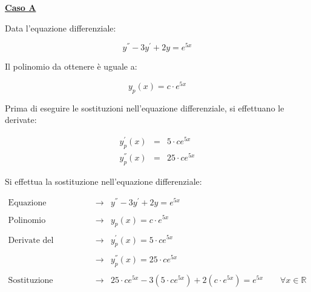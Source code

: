 \documentclass[a4paper]{article}
\begin{document}
	\begin{center}
		\large
		\textcolor{Green4}{\textbf{\underline{Caso A}}}
	\end{center}

	\noindent
	Data l'equazione differenziale:
	
	\begin{equation*}
		y^{''} - 3y^{'} +2y = e^{5x}
	\end{equation*}

	\noindent
	Il polinomio da ottenere è uguale a:
	
	\begin{equation*}
		y_{p}\left(x\right) = c \cdot e^{5x}
	\end{equation*}

	\noindent
	Prima di eseguire le sostituzioni nell'equazione differenziale, si effettuano le derivate:
	
	\begin{equation*}
		\begin{array}{lll}
			y_{p}^{'}\left(x\right)	& = & 5 \cdot c e^{5x} \\
			y_{p}^{''}\left(x\right)& = & 25 \cdot c e^{5x}
		\end{array}
	\end{equation*}

	\noindent
	Si effettua la sostituzione nell'equazione differenziale:
	
	\begin{equation*}
		\begin{array}{lll}
			\text{Equazione differenziale}	& \longrightarrow & y^{''} - 3y^{'} +2y = e^{5x} \\
			&& \\
			\text{Polinomio}				& \longrightarrow & y_{p}\left(x\right) = c \cdot e^{5x} \\
			&& \\
			\text{Derivate del polinomio}	& \longrightarrow & y_{p}^{'}\left(x\right)	= 5 \cdot c e^{5x} \\
			&& \\
											& \longrightarrow & y_{p}^{''}\left(x\right) = 25 \cdot c e^{5x} \\
			&& \\
			\text{Sostituzione}				& \longrightarrow & 25 \cdot c e^{5x} - 3 \left(5 \cdot c e^{5x}\right) + 2 \left(c \cdot e^{5x}\right) = e^{5x} \hspace{2em} \forall x \in \mathbb{R}
		\end{array}
	\end{equation*}
\end{document}
